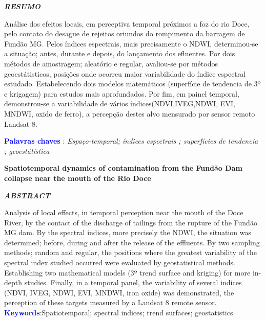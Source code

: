 
\begin{center}
	\textbf{\textit{RESUMO}}
\end{center}
\noindent Análise dos efeitos locais, em perceptiva temporal  próximos a foz do rio Doce, pelo contato do desague de rejeitos oriundos do rompimento da barragem de Fundão MG. Pelos índices espectrais, mais precisamente o NDWI, determinou-se  a situação; antes, durante e depois, do lançamento dos efluentes. Por dois métodos de amostragem; aleatório e regular, avaliou-se por métodos geoestátisticos, posições onde ocorreu maior variabilidade do índice espectral estudado. Estabelecendo dois modelos matemáticos (superfície de tendencia de 3º e krigagem) para estudos mais aprofundados. Por fim, em painel temporal, demonstrou-se a variabilidade de vários índices(NDVI,IVEG,NDWI, EVI, MNDWI, oxido de ferro), a percepção destes alvo mensurado por sensor remoto Landsat 8. 

\noindent \textbf{\textcolor{blue}{Palavras chaves}  }:  \textit{ Espaço-temporal; índices espectrais  ;  superfícies de tendencia ; geoestátistica }

\begin{center}
\textbf{Spatiotemporal dynamics of contamination from the Fundão Dam collapse near the mouth of the Rio Doce}
\end{center}
\begin{center}
	\textbf{\textit{ABSTRACT}}
\end{center}
\noindent  
\noindent  Analysis of local effects, in temporal perception near the mouth of the Doce River, by the contact of the discharge of tailings from the rupture of the Fundão MG dam. By the spectral indices, more precisely the NDWI, the situation was determined; before, during and after the release of the effluents. By two sampling methods; random and regular, the positions where the greatest variability of the spectral index studied occurred were evaluated by geostatistical methods. Establishing two mathematical models (3º trend surface and kriging) for more in-depth studies. Finally, in a temporal panel, the variability of several indices (NDVI, IVEG, NDWI, EVI, MNDWI, iron oxide) was demonstrated, the perception of these targets measured by a Landsat 8 remote sensor.
\noindent\textbf{\textcolor{blue}{ Keywords}}:Spatiotemporal; spectral indices; trend surfaces; geostatistics 

\begin{comment}
	\cite{Anderson}
	\cite{Anderson}\\
	\citep{Anderson}\\
	\citet{Anderson}\\
	\citealp{Anderson}, \\
	\citealt{Anderson}, \\
	\citeauthor{Anderson}, \\
	\citeyear{Anderson}, \\
	\citeyearpar{Anderson}, \\
	\citeauthor*{Anderson}, \\
	\citep*{Anderson}, \\
	\citet*{Tanimoto}
\end{comment}
 